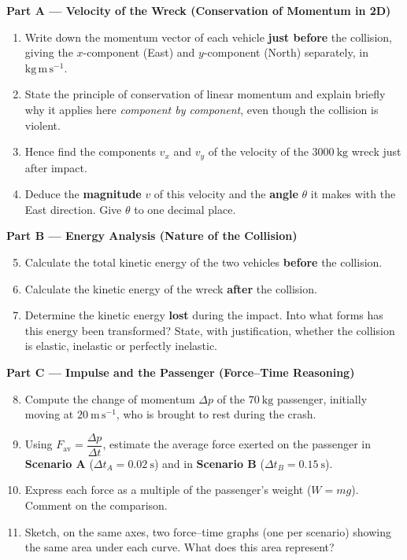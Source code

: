 \documentclass[11pt]{article}
\begin{document}
\textbf{Part A --- Velocity of the Wreck (Conservation of Momentum in 2D)}\par
\begin{enumerate}
\item Write down the momentum vector of each vehicle \textbf{just before} the collision, giving the $x$-component (East) and $y$-component (North) separately, in $\mathrm{kg\,m\,s^{-1}}$.
\item State the principle of conservation of linear momentum and explain briefly why it applies here \emph{component by component}, even though the collision is violent.
\item Hence find the components $v_x$ and $v_y$ of the velocity of the $3000\ \mathrm{kg}$ wreck just after impact.
\item Deduce the \textbf{magnitude} $v$ of this velocity and the \textbf{angle} $\theta$ it makes with the East direction. Give $\theta$ to one decimal place.
\end{enumerate}

\textbf{Part B --- Energy Analysis (Nature of the Collision)}\par
\begin{enumerate}
\setcounter{enumi}{4}
\item Calculate the total kinetic energy of the two vehicles \textbf{before} the collision.
\item Calculate the kinetic energy of the wreck \textbf{after} the collision.
\item Determine the kinetic energy \textbf{lost} during the impact. Into what forms has this energy been transformed? State, with justification, whether the collision is elastic, inelastic or perfectly inelastic.
\end{enumerate}

\textbf{Part C --- Impulse and the Passenger (Force--Time Reasoning)}\par
\begin{enumerate}
\setcounter{enumi}{7}
\item Compute the change of momentum $\Delta p$ of the $70\ \mathrm{kg}$ passenger, initially moving at $20\ \mathrm{m\,s^{-1}}$, who is brought to rest during the crash.
\item Using $F_{\text{av}} = \dfrac{\Delta p}{\Delta t}$, estimate the average force exerted on the passenger in \textbf{Scenario A} ($\Delta t_A = 0.02\ \mathrm{s}$) and in \textbf{Scenario B} ($\Delta t_B = 0.15\ \mathrm{s}$).
\item Express each force as a multiple of the passenger's weight ($W = mg$). Comment on the comparison.
\item Sketch, on the same axes, two force--time graphs (one per scenario) showing the same area under each curve. What does this area represent?
\end{enumerate}
\end{document}
